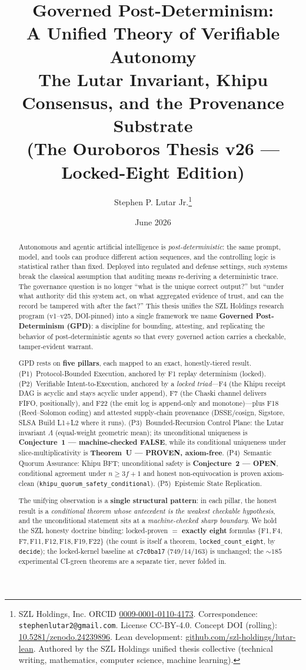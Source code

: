 \documentclass[11pt,letterpaper]{article}
\title{\textbf{Governed Post-Determinism:}\\
  A Unified Theory of Verifiable Autonomy\\
  \large The Lutar Invariant, Khipu Consensus, and the Provenance Substrate\\
  \normalsize (The Ouroboros Thesis v26 --- Locked-Eight Edition)}
\author{Stephen P. Lutar Jr.\thanks{SZL Holdings, Inc. ORCID
  \href{https://orcid.org/0009-0001-0110-4173}{0009-0001-0110-4173}.
  Correspondence: \texttt{stephenlutar2@gmail.com}. License CC-BY-4.0.
  Concept DOI (rolling): \href{https://doi.org/10.5281/zenodo.24239896}{10.5281/zenodo.24239896}.
  Lean development: \href{https://github.com/szl-holdings/lutar-lean}{github.com/szl-holdings/lutar-lean}.
  Authored by the SZL Holdings unified thesis collective (technical writing,
  mathematics, computer science, machine learning).}}
\date{June 2026}
\theoremstyle{definition}
\newcommand{\Lam}{\Lambda}
\begin{document}
\maketitle

\begin{abstract}
Autonomous and agentic artificial intelligence is \emph{post-deterministic}:
the same prompt, model, and tools can produce different action sequences, and
the controlling logic is statistical rather than fixed. Deployed into regulated
and defense settings, such systems break the classical assumption that auditing
means re-deriving a deterministic trace. The governance question is no longer
``what is the unique correct output?'' but ``under what authority did this
system act, on what aggregated evidence of trust, and can the record be tampered
with after the fact?'' This thesis unifies the SZL Holdings research program
(v1--v25, DOI-pinned) into a single framework we name \textbf{Governed
Post-Determinism (GPD)}: a discipline for bounding, attesting, and replicating
the behavior of post-deterministic agents so that every governed action carries
a checkable, tamper-evident warrant.

GPD rests on \textbf{five pillars}, each mapped to an exact, honestly-tiered
result. (P1)~Protocol-Bounded Execution, anchored by F1 replay determinism
(locked). (P2)~Verifiable Intent-to-Execution, anchored by a \emph{locked
triad}---F4 (the Khipu receipt DAG is acyclic and stays acyclic under append),
F7 (the Chaski channel delivers FIFO, positionally), and F22 (the emit log is
append-only and monotone)---plus F18 (Reed--Solomon coding) and attested
supply-chain provenance (DSSE/cosign, Sigstore, SLSA Build L1+L2 where it runs).
(P3)~Bounded-Recursion Control Plane: the Lutar invariant $\Lam$ (equal-weight
geometric mean); its unconditional uniqueness is \textbf{Conjecture~1 ---
machine-checked FALSE}, while its conditional uniqueness under
slice-multiplicativity is \textbf{Theorem~U --- PROVEN, axiom-free}.
(P4)~Semantic Quorum Assurance: Khipu BFT; unconditional safety is
\textbf{Conjecture~2 --- OPEN}, conditional agreement under $n\ge 3f+1$ and
honest non-equivocation is proven axiom-clean (\texttt{khipu\_quorum\_safety\_conditional}).
(P5)~Epistemic State Replication.

The unifying observation is a \textbf{single structural pattern}: in each
pillar, the honest result is a \emph{conditional theorem whose antecedent is the
weakest checkable hypothesis}, and the unconditional statement sits at a
\emph{machine-checked sharp boundary}. We hold the SZL honesty doctrine binding:
locked-proven $=$ \textbf{exactly eight} formulas
$\{$F1,\,F4,\,F7,\,F11,\,F12,\,F18,\,F19,\,F22$\}$ (the count is itself a
theorem, \texttt{locked\_count\_eight}, by \texttt{decide}); the locked-kernel
baseline at \texttt{c7c0ba17} (749/14/163) is unchanged; the ${\sim}185$
experimental CI-green theorems are a separate tier, never folded in.
\end{abstract}
\end{document}
